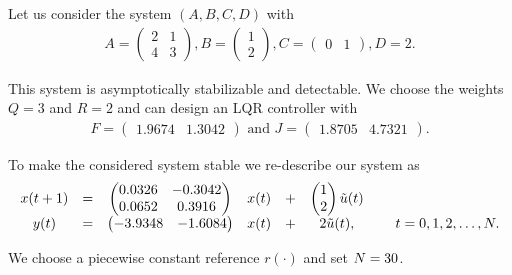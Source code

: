 \begin{exam}
	\label{ex:ILC:LQR}
Let us consider the system $(A,B,C,D)$ with 
\begin{align}
\label{eq:ILC:Sys_ex1_origin}
A = \begin{pmatrix}
2 & 1 \\  4 & 3
\end{pmatrix}, B = \begin{pmatrix}
1 \\ 2
\end{pmatrix}, C = \begin{pmatrix}
0 & 1
\end{pmatrix}, D = 2.
\end{align}

This system is asymptotically stabilizable and detectable. We choose the weights $Q = 3$ and $R = 2$ and can design an LQR controller with 
\begin{align}
F =\begin{pmatrix}
1.9674  &  1.3042
\end{pmatrix} \text{ and } 
J = \begin{pmatrix}
1.8705  &  4.7321
\end{pmatrix}. 
\end{align}

To make the considered system stable we re-describe our system as
\begin{align}
\label{eq:ILC:Sys_ex1}
\begin{array}{c c c c c c c c c}
x(t+1) &=&
\begin{pmatrix}
0.0326  & -0.3042\\
0.0652  &  0.3916
\end{pmatrix}
& x(t) &+& 
\begin{pmatrix}
1 \\ 2
\end{pmatrix}
\tilde{u}(t)& &
\\ 
y(t)   &=& \begin{pmatrix}
	-3.9348  & -1.6084
\end{pmatrix}
& x(t)& +&
 2 \tilde{u} (t),& &\; t = 0, 1, 2, \dots, N. 
\end{array}
\end{align} 

We choose a piecewise constant reference $r(\cdot)$  and set $N = 30$. 


\end{exam}
